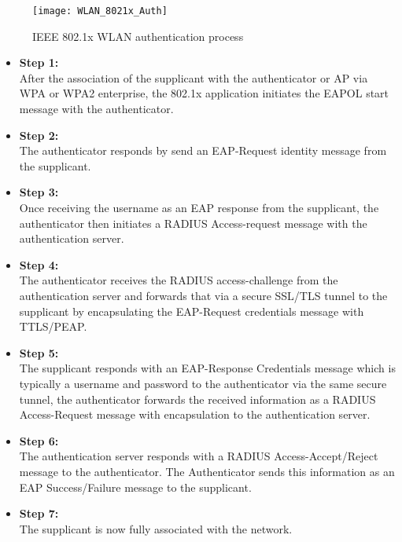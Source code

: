 \begin{figure}[H]
	\centering
	\texttt{[image: WLAN\_8021x\_Auth]}
	\caption {IEEE 802.1x WLAN authentication process \cite{WLAN_802.1x_img}}
	\label{fig:WLAN_802.1x_auth_img}
	\vspace{-10pt}
\end{figure}

\begin{itemize}
	\item \textbf{Step 1:} 
	\\ After the association of the supplicant with the authenticator or AP via WPA or WPA2 enterprise, the 802.1x application initiates the EAPOL start message with the authenticator. 
	\item \textbf{Step 2:} 
	\\ The authenticator responds by send an EAP-Request identity message from the supplicant. 
	\item \textbf{Step 3:}
	\\ Once receiving the username as an EAP response from the supplicant, the authenticator then initiates a RADIUS Access-request message with the authentication server. 
	\item \textbf{Step 4:}
	\\ The authenticator receives the RADIUS access-challenge from the authentication server and forwards that via a secure SSL/TLS tunnel to the supplicant by encapsulating the EAP-Request credentials message with TTLS/PEAP.
	\item \textbf{Step 5:}
	\\ The supplicant responds with an EAP-Response Credentials message which is typically a username and password to the authenticator via the same secure tunnel, the authenticator forwards the received information as a RADIUS Access-Request message with encapsulation to the authentication server. 
	\item \textbf{Step 6:}
	\\ The authentication server responds with a RADIUS Access-Accept/Reject message to the authenticator. The Authenticator sends this information as an EAP Success/Failure message to the supplicant. 
	\item \textbf{Step 7:}
	\\ The supplicant is now fully associated with the network.
	
\end{itemize}
